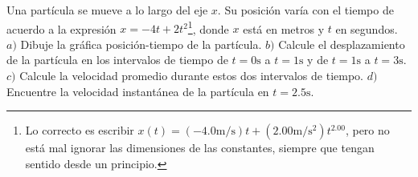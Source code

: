 \begin{ejemplo}
Una part\'icula se mueve a lo largo del eje $x$. Su posici\'on var\'ia con el tiempo de acuerdo a la expresi\'on $x=-4t+2t^2$\footnote{Lo correcto es escribir $x(t)=(-4.0\si{\meter/\second})t+(2.00\si{\meter/\second^2})t^{2.00}$, pero no est\'a mal ignorar las dimensiones de las constantes, siempre que tengan sentido desde un principio.}, donde $x$ est\'a en metros y $t$ en segundos. $a)$ Dibuje la gr\'afica posici\'on-tiempo de la part\'icula. $b)$ Calcule el desplazamiento de la part\'icula en los intervalos de tiempo de $t=0\si{\second}$ a $t=1\si{\second}$ y de $t=1\si{\second}$ a $t=3\si{\second}$. $c)$ Calcule la velocidad promedio durante estos dos intervalos de tiempo. $d)$ Encuentre la velocidad instant\'anea de la part\'icula en $t=2.5\si{\second}$.
\end{ejemplo}

